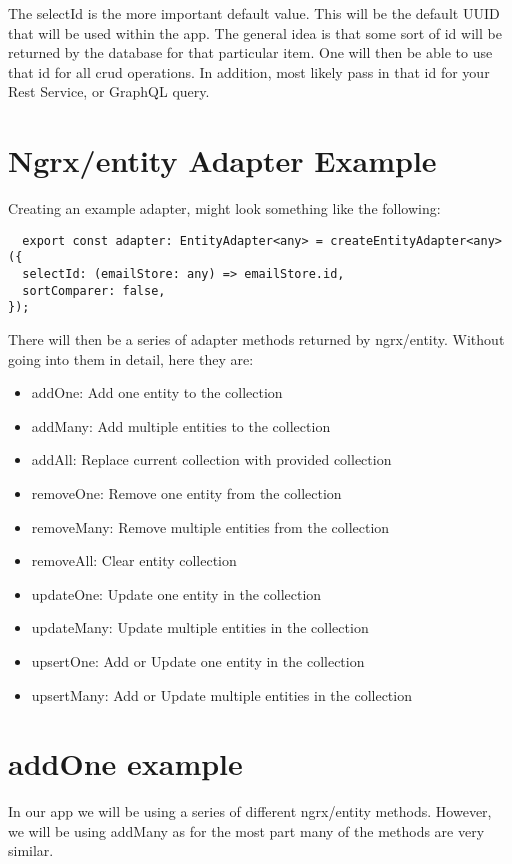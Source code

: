 The selectId is the more important default value. This will be the default UUID
that will be used within the app. The general idea is that some sort of id will
be returned by the database for that particular item. One will then be able to
use that id for all crud operations. In addition, most likely pass in that id
for your Rest Service, or GraphQL query.

\section{ Ngrx/entity Adapter Example }
Creating an example adapter, might look something like the following:
\begin{lstlisting}
  export const adapter: EntityAdapter<any> = createEntityAdapter<any>({
  selectId: (emailStore: any) => emailStore.id,
  sortComparer: false,
});
\end{lstlisting}

There will then be a series of adapter methods returned by ngrx/entity. Without
going into them in detail, here they are:
\begin{itemize}
  \item addOne: Add one entity to the collection
  \item addMany: Add multiple entities to the collection
  \item addAll: Replace current collection with provided collection
  \item removeOne: Remove one entity from the collection
  \item removeMany: Remove multiple entities from the collection
  \item removeAll: Clear entity collection
  \item updateOne: Update one entity in the collection
  \item updateMany: Update multiple entities in the collection
  \item upsertOne: Add or Update one entity in the collection
  \item upsertMany: Add or Update multiple entities in the collection
\end{itemize}

\section{ addOne example }
In our app we will be using a series of different ngrx/entity methods. However,
we will be using addMany as for the most part many of the methods are very
similar.

